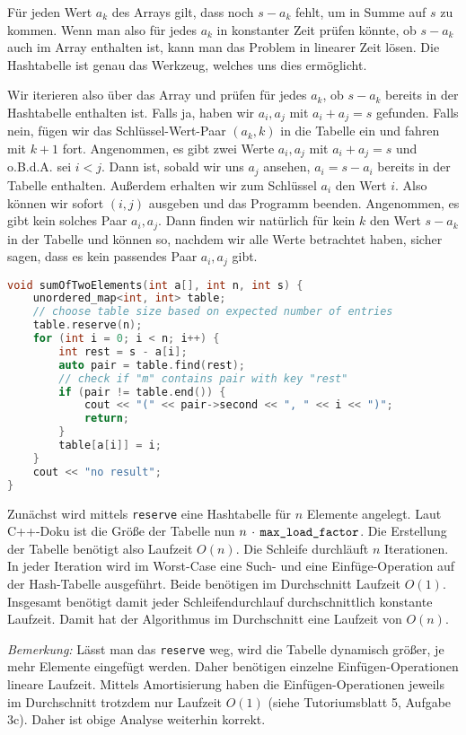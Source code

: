 \documentclass[11pt,a4paper]{article}
\begin{document}
\begin{loesung}
    Für jeden Wert $a_k$ des Arrays gilt, dass noch $s - a_k$ fehlt, um in Summe auf $s$ zu kommen.
    Wenn man also für jedes $a_k$ in konstanter Zeit prüfen könnte, ob $s - a_k$ auch im Array enthalten ist, kann man das Problem in linearer Zeit lösen.
    Die Hashtabelle ist genau das Werkzeug, welches uns dies ermöglicht.

    Wir iterieren also über das Array und prüfen für jedes $a_k$, ob $s - a_k$ bereits in der Hashtabelle enthalten ist.
    Falls ja, haben wir $a_i, a_j$ mit $a_i + a_j = s$ gefunden.
    Falls nein, fügen wir das Schlüssel-Wert-Paar $(a_k, k)$ in die Tabelle ein und fahren mit $k + 1$ fort.
    Angenommen, es gibt zwei Werte $a_i, a_j$ mit $a_i + a_j = s$ und o.B.d.A. sei $i < j$.
    Dann ist, sobald wir uns $a_j$ ansehen, $a_i = s - a_i$ bereits in der Tabelle enthalten.
    Außerdem erhalten wir zum Schlüssel $a_i$ den Wert $i$.
    Also können wir sofort $(i, j)$ ausgeben und das Programm beenden.
    Angenommen, es gibt kein solches Paar $a_i, a_j$.
    Dann finden wir natürlich für kein $k$ den Wert $s - a_k$ in der Tabelle und können so, nachdem wir alle Werte betrachtet haben, sicher sagen, dass es kein passendes Paar $a_i, a_j$ gibt.
    \begin{minipage}{\linewidth}
    \begin{lstlisting}[language=c++]
void sumOfTwoElements(int a[], int n, int s) {
    unordered_map<int, int> table;
    // choose table size based on expected number of entries
    table.reserve(n);
    for (int i = 0; i < n; i++) {
        int rest = s - a[i];
        auto pair = table.find(rest);
        // check if "m" contains pair with key "rest"
        if (pair != table.end()) {
            cout << "(" << pair->second << ", " << i << ")";
            return;
        }
        table[a[i]] = i;
    }
    cout << "no result";
}
    \end{lstlisting}
    \end{minipage}
    
    Zunächst wird mittels \texttt{reserve} eine Hashtabelle für $n$ Elemente angelegt.
    Laut C++-Doku ist die Größe der Tabelle nun $n \,\cdot \,\text{\texttt{max\_load\_factor}}$.
    Die Erstellung der Tabelle benötigt also Laufzeit $O(n)$.
    Die Schleife durchläuft $n$ Iterationen.
    In jeder Iteration wird im Worst-Case eine Such- und eine Einfüge-Operation auf der Hash-Tabelle ausgeführt.
    Beide benötigen im Durchschnitt Laufzeit $O(1)$.
    Insgesamt benötigt damit jeder Schleifendurchlauf durchschnittlich konstante Laufzeit.
    Damit hat der Algorithmus im Durchschnitt eine Laufzeit von $O(n)$.

    \emph{Bemerkung:} Lässt man das \texttt{reserve} weg, wird die Tabelle dynamisch größer, je mehr Elemente eingefügt werden.
    Daher benötigen einzelne Einfügen-Operationen lineare Laufzeit.
    Mittels Amortisierung haben die Einfügen-Operationen jeweils im Durchschnitt trotzdem nur Laufzeit $O(1)$ (siehe Tutoriumsblatt 5, Aufgabe 3c).
    Daher ist obige Analyse weiterhin korrekt.
\end{loesung}
\end{document}
